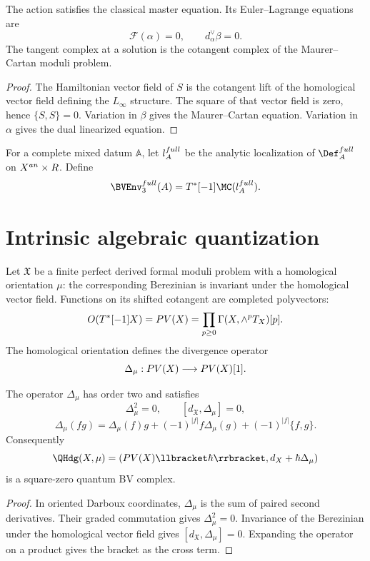 \begin{theorem}
The action satisfies the classical master equation.  Its Euler--Lagrange equations are
\[
 \mathcal F(\alpha)=0,
 \qquad
 d_\alpha^\vee\beta=0.
\]
The tangent complex at a solution is the cotangent complex of the Maurer--Cartan moduli problem.
\end{theorem}
\begin{proof}
The Hamiltonian vector field of $S$ is the cotangent lift of the homological vector field defining the $L_\infty$ structure.  The square of that vector field is zero, hence $\{S,S\}=0$.  Variation in $\beta$ gives the Maurer--Cartan equation.  Variation in $\alpha$ gives the dual linearized equation.
\end{proof}

\begin{definition}
For a complete mixed datum $\mathbb A$, let $l_{A}^{full}$ be the analytic localization of $\Def_{\mathbb A}^{\mathrm{full}}$ on $X^{an}\times R$.  Define
\[
 \BVEnv_3^{\mathrm{full}}(\mathbb A)
 =T^*[-1]\MC(\flie_{\mathbb A}^{\mathrm{full}}).
\]
\end{definition}

\chapter{Intrinsic algebraic quantization}
Let $\mathfrak X$ be a finite perfect derived formal moduli problem with a homological orientation $\mu$: the corresponding Berezinian is invariant under the homological vector field.  Functions on its shifted cotangent are completed polyvectors:
\[
 O(T^*[-1]X)
 =PV(X)
 =\prod_{p\ge0}\Gamma(X,\wedge^pT_{X})[p].
\]
The homological orientation defines the divergence operator
\[
 \Delta_\mu:PV(X)
 \longrightarrow PV(X)[1].
\]

\begin{theorem}
The operator $\Delta_\mu$ has order two and satisfies
\[
 \Delta_\mu^2=0,
 \qquad
 [d_{\mathfrak X},\Delta_\mu]=0,
\]
\[
 \Delta_\mu(fg)=\Delta_\mu(f)g+(-1)^{|f|}f\Delta_\mu(g)
 +(-1)^{|f|}\{f,g\}.
\]
Consequently
\[
 \QHdg(\mathfrak X,\mu)
 =\left(\widehat\PV(\mathfrak X)\llbracket\hbar\rrbracket,
 d_{\mathfrak X}+\hbar\Delta_\mu\right)
\]
is a square-zero quantum BV complex.
\end{theorem}
\begin{proof}
In oriented Darboux coordinates, $\Delta_\mu$ is the sum of paired second derivatives.  Their graded commutation gives $\Delta_\mu^2=0$.  Invariance of the Berezinian under the homological vector field gives $[d_{\mathfrak X},\Delta_\mu]=0$.  Expanding the operator on a product gives the bracket as the cross term.
\end{proof}

